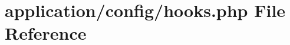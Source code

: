 \hypertarget{application_2config_2hooks_8php}{\section{application/config/hooks.php File Reference}
\label{application_2config_2hooks_8php}
}

